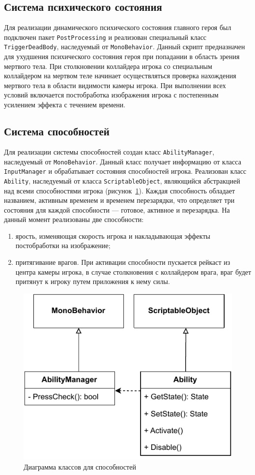 \subsection{Система психического состояния}
Для реализации динамического психического состояния главного героя был подключен пакет \texttt{PostProcessing} и реализован специальный класс \texttt{TriggerDeadBody}, наследуемый от \texttt{MonoBehavior}. Данный скрипт предназначен для ухудшения психического состояния героя при попадании в область зрения мертвого тела. При столкновении коллайдера игрока со специальным коллайдером на мертвом теле начинает осуществляться проверка нахождения мертвого тела в области видимости камеры игрока. При выполнении всех условий включается постобработка изображения игрока с постепенным усилением эффекта с течением времени.

\subsection{Система способностей}
Для реализации системы способностей создан класс \texttt{AbilityManager}, наследуемый от \texttt{MonoBehavior}. Данный класс получает информацию от класса \texttt{InputManager} и обрабатывает состояния способностей игрока. Реализован класс \texttt{Ability}, наследуемый от класса \texttt{ScriptableObject}, являющийся абстракцией над всеми способностями игрока (рисунок~\ref{fig:Ability}). Каждая способность обладает названием, активным временем и временем перезарядки, что определяет три состояния для каждой способности --- готовое, активное и перезарядка. На данный момент реализованы две способности:
\begin{enumerate}
\item  ярость, изменяющая скорость игрока и накладывающая эффекты постобработки на изображение;
\item  притягивание врагов. При активации способности пускается рейкаст из центра камеры игрока, в случае столкновения с коллайдером врага, враг будет притянут к игроку путем приложения к нему силы.
\end{enumerate}

\begin{figure}[H]
    \centering
    \includegraphics[width=\textwidth]{figures/Ability.pdf}
    \caption{Диаграмма классов для способностей}
    \label{fig:Ability}
\end{figure}
